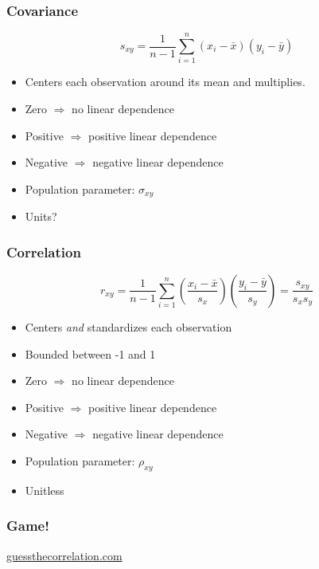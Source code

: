 \documentclass[handout]{beamer}
\begin{document}
\begin{frame}
\frametitle{Covariance}
	$$
	s_{xy} = \frac{1}{n-1} \sum_{i=1}^n (x_i -\bar{x})(y_i - \bar{y})
	$$
	\begin{itemize}
		\item Centers each observation around its mean and multiplies.
		\item Zero $\Rightarrow$ no linear dependence
		\item Positive $\Rightarrow$ positive linear dependence
		\item Negative $\Rightarrow$ negative linear dependence
		\item Population parameter: $\sigma_{xy}$
		\item Units?
	\end{itemize}
\end{frame}

\begin{frame}
\frametitle{Correlation}
	$$
	r_{xy} = \frac{1}{n - 1} \sum_{i = 1}^n \left(\frac{x_i  - \bar{x}}{s_x}\right)\left(\frac{y_i - \bar{y}}			{s_y}\right) = \frac{s_{xy}}{s_x s_y}
	$$
	\begin{itemize}
		\item Centers \emph{and} standardizes each observation 
		\item Bounded between -1 and 1
		\item Zero $\Rightarrow$ no linear dependence
		\item Positive $\Rightarrow$ positive linear dependence
		\item Negative $\Rightarrow$ negative linear dependence
		\item Population parameter: $\rho_{xy}$
		\item Unitless
	\end{itemize}
\end{frame}

\begin{frame}
\frametitle{Game!}
	\url{guessthecorrelation.com}
\end{frame}
\end{document}
